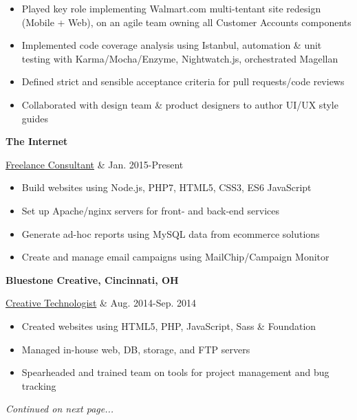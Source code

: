 \documentclass[margin,10pt]{res} %
\begin{document}
\begin{resume}
	\begin{itemize}
		\item Played key role implementing Walmart.com  multi-tentant site redesign (Mobile + Web), on an agile team owning all Customer Accounts components
		\item Implemented code coverage analysis using Istanbul, automation \& unit testing with Karma/Mocha/Enzyme, Nightwatch.js, orchestrated Magellan
		\item Defined strict and sensible acceptance criteria for pull requests/code reviews
		\item Collaborated with design team \& product designers to author UI/UX style guides
	\end{itemize}

	{\bf The Internet} \\
	\begin{ncolumn}{2} %
		\underline{Freelance Consultant} &   Jan. 2015-Present
	\end{ncolumn}

	\begin{itemize}
		\item Build websites using Node.js, PHP7, HTML5, CSS3, ES6 JavaScript
		\item Set up Apache/nginx servers for front- and back-end services
		\item Generate ad-hoc reports using MySQL data from ecommerce solutions
		\item Create and manage email campaigns using MailChip/Campaign Monitor
	\end{itemize}

	{\bf Bluestone Creative, Cincinnati, OH} \\
	\begin{ncolumn}{2} %
		\underline{Creative Technologist} &   Aug. 2014-Sep. 2014
	\end{ncolumn}

	\begin{itemize}
		\item Created websites using HTML5, PHP, JavaScript, Sass \& Foundation
		\item Managed in-house web, DB, storage, and FTP servers
		\item Spearheaded and trained team on tools for project management and bug tracking
	\end{itemize}

	\begin{FlushRight}
		\textit{Continued on next page...}\pagebreak
	\end{FlushRight}


\end{resume}
\end{document}
